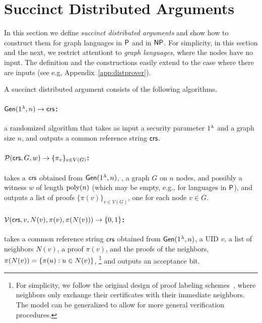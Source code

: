 \section{Succinct Distributed Arguments}\label{sec:dargs}
In this section we define \emph{succinct distributed arguments} and show how to construct them for graph languages in
${\mathsf{P}}$ and in ${\mathsf{NP}}$.
For simplicity, in this section and the next,
we restrict attentiont to \emph{graph languages},
where the nodes have no input.
The definition and the constructions easily extend to the case where there are inputs
(see e.g, Appendix~\ref{app:distprover}).

A succinct distributed argument consists of the following algorithms.

\paragraph{$\mathsf{Gen}(1^\lambda, n)\to \mathit{ \mathsf{crs} }$:} a randomized algorithm that takes as input a security parameter $1^\lambda$ and a graph size $n$, and outputs a common reference string $\mathit{ \mathsf{crs} }$.

\paragraph{$\mathcal{P}(\mathit{ \mathsf{crs} }, G, w)\to \{\pi_v\}_{v\in V(G)}$:}
takes a $\mathit{ \mathsf{crs} }$ obtained from $\mathsf{Gen}(1^{\lambda}, n)$,
, %
a graph $G$ on $n$ nodes, and possibly a witness $w$ of length $\operatorname{poly}(n)$ (which may be empty, e.g., for languages in ${\mathsf{P}}$),
and outputs a list of proofs $\{\pi(v)\}_{v\in V(G)}$,
one for each node $v \in G$.

\paragraph{$\mathcal{V}(\mathit{ \mathsf{crs} }, v, N(v), \pi(v), \pi(N(v)) )\to \{0,1\}$:}
takes a common reference string $\mathsf{crs}$ obtained from $\mathsf{Gen}(1^{\lambda}, n)$,
a UID $v$, a list of neighbors $N(v)$, a proof $\pi(v)$,
and the proofs of the neighbors, $\pi(N(v)) = \left \{{ \pi(u) : u \in N(v) } \right \}$,%
\footnote{For simplicity, we follow the original design of proof labeling schemes~\cite{korman2005proof},
where neighbors only exchange their certificates with their immediate neighbors.
The model can be generalized to allow for more general verification procedures.}
and outputs an acceptance bit.

